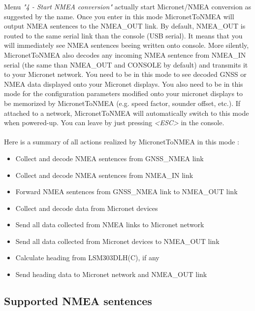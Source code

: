 \documentclass{report}
\begin{document}
Menu \emph{"4 - Start NMEA conversion"} actually start Micronet/NMEA conversion as suggested by the name. Once you enter in this mode MicronetToNMEA will output NMEA sentences to the NMEA\_OUT link. By default, NMEA\_OUT is routed to the same serial link than the console (USB serial). It means that you will immediately see NMEA sentences beeing written onto console. More silently, MicronetToNMEA also decodes any incoming NMEA sentence from NMEA\_IN serial (the same than NMEA\_OUT and CONSOLE by default) and transmits it to your Micronet network.
You need to be in this mode to see decoded GNSS or NMEA data displayed onto your Micronet displays. You also need to be in this mode for the configuration parameters modified onto your micronet displays to be memorized by MicronetToNMEA (e.g. speed factor, sounder offset, etc.).
If attached to a network, MicronetToNMEA will automatically switch to this mode when powered-up. You can leave by just pressing \emph{<ESC>} in the console.
\\
\\
Here is a summary of all actions realized by MicronetToNMEA in this mode :
\begin{itemize}
	\item Collect and decode NMEA sentences from GNSS\_NMEA link
	\item Collect and decode NMEA sentences from NMEA\_IN link
	\item Forward NMEA sentences from GNSS\_NMEA link to NMEA\_OUT link
	\item Collect and decode data from Micronet devices
	\item Send all data collected from NMEA links to Micronet network
	\item Send all data collected from Micronet devices to NMEA\_OUT link
	\item Calculate heading from LSM303DLH(C), if any
	\item Send heading data to Micronet network and NMEA\_OUT link
\end{itemize}

\subsection{Supported NMEA sentences}
\end{document}
